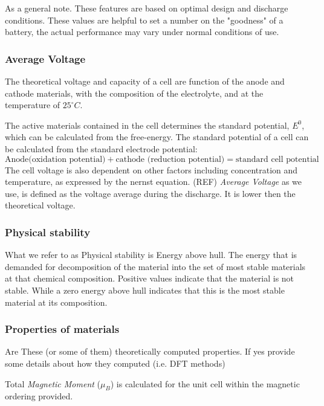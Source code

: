 	As a general note. These features are based on optimal design and discharge conditions. These values are helpful to set a number on the "goodness" of a battery, the actual performance may vary under normal conditions of use. 

	
	\subsubsection*{Average Voltage}
	The theoretical voltage and capacity of a cell are function of the anode and cathode materials, with the composition of the electrolyte, and at the temperature of $25^\circ\si{C}$. 
	
	The active materials contained in the cell determines the standard potential, $E^0$, which can be calculated from the free-energy. 
	The standard potential of a cell can be calculated from the standard electrode potential:
	\begin{equation}
	\text{Anode(oxidation potential)} + \text{cathode (reduction potential)} = \text{standard cell potential}
	\end{equation}  
	The cell voltage is also dependent on other factors including concentration and temperature, as expressed by the nernst equation. (REF)
	\textit{Average Voltage} as we use, is defined as the voltage average during the discharge. It is lower then the theoretical voltage.
	 


	\subsubsection*{Physical stability}
	What we refer to as Physical stability is Energy above hull. The energy that is demanded for decomposition of the material into the set of most stable materials at that chemical composition. Positive values indicate that the material is not stable. While a zero energy above hull indicates that this is the most stable material at its composition. 
	
	\subsubsection{Properties of materials}
	Are These (or some of them) theoretically computed properties. If yes provide some details about how they computed (i.e. DFT methods)

Total \textit{Magnetic Moment} ($\si{\mu_B}$) is calculated for the unit cell within the magnetic ordering provided. 


